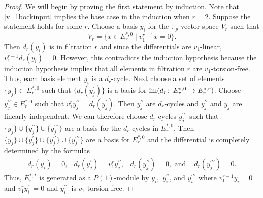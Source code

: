 \begin{proof}
We will begin by proving the first statement by induction. Note that \eqref{v_1bockinput} implies the base case in the induction when $r=2$. Suppose the statement holds for some $r$. Choose a basis $y_i$ for the $\mathbb{F}_p$-vector space $V_r$ such that 
\[V_r=\{ x \in E_r^{*,0}\mid v_1^{r-1}x=0\}.\] 
Then $d_r(y_i)$ is in filtration $r$ and since the differentials are $v_1$-linear, $v_1^{r-1}d_r(y_i)=0$. However, this contradicts the induction hypothesis because the induction hypothesis implies that all elements in filtration $r$ are $v_1$-torsion-free. Thus, each basis element $y_i$ is a $d_r$-cycle. Next choose a set of elements $\{y^{\prime}_j\}\subset E_r^{*,0}$ such that $\{d_r(y_j^{\prime})\}$ is a basis for $\operatorname{im}(d_r\colon \thinspace E_r^{*,0}\to E_r^{*,r})$. Choose $y^{\prime\prime}_j\in E_r^{*,0}$ such that $v_1^{r}y^{\prime\prime}_j=d_r(y_j^{\prime})$. Then $y^{\prime\prime}_j$ are $d_r$-cycles and $y^{\prime \prime}_j$ and $y_j$ are linearly independent. We can therefore choose $d_r$-cycles $y^{\prime \prime\prime}_j$ such that $\{y_j\}\cup\{y_j^{\prime\prime}\}\cup\{y_j^{\prime\prime\prime}\}$ are a basis for the $d_r$-cycles in $E_{r}^{*,0}$. Then 
$\{y_j\}\cup\{y_j^{\prime}\}\cup \{y_j^{\prime\prime}\}\cup\{y_j^{\prime\prime\prime}\}$
are a basis for $E_r^{*,0}$ and the differential is completely determined by the formulas
\[ \begin{array}{cccc} d_r(y_i)=0 , &d_r(y_j^{\prime})=v_1^{r}y_j^{\prime \prime}, & d_r(y_j^{\prime \prime})=0, \text{ and } & d_r(y_j^{\prime \prime \prime})=0. \end{array}\]
Thus, $E_r^{*,*}$ is generated as a $P(1)$-module by $y_i,$ $y_i^{\prime \prime}$, and $y_i^{\prime \prime\prime}$ where $v_1^{r-1}y_i=0$ and $v_1^ry_i^{\prime \prime}=0$ and $y_i^{\prime \prime \prime}$ is $v_1$-torsion free. 
\end{proof}
